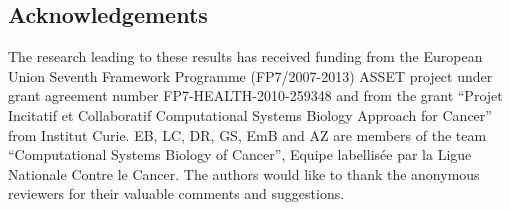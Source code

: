 \documentclass[11pt]{bmc_article_s50}
\newenvironment{bmcformat}{\begin{raggedright}\baselineskip20pt\sloppy\setboolean{publ}{false}}{\end{raggedright}\baselineskip20pt\sloppy}
\begin{document}
\begin{bmcformat}
\section*{Acknowledgements}
The research leading to these results has received funding from the European
Union Seventh Framework Programme (FP7/2007-2013) ASSET project under grant
agreement number FP7-HEALTH-2010-259348 and from the grant ``Projet Incitatif
et Collaboratif Computational Systems Biology Approach for Cancer'' from
Institut Curie. EB, LC, DR, GS, EmB and AZ are members of the team
``Computational Systems Biology of Cancer'', Equipe labellisée par la Ligue
Nationale Contre le Cancer. The authors would like to thank the anonymous
reviewers for their valuable comments and suggestions.









\end{bmcformat}
\end{document}
